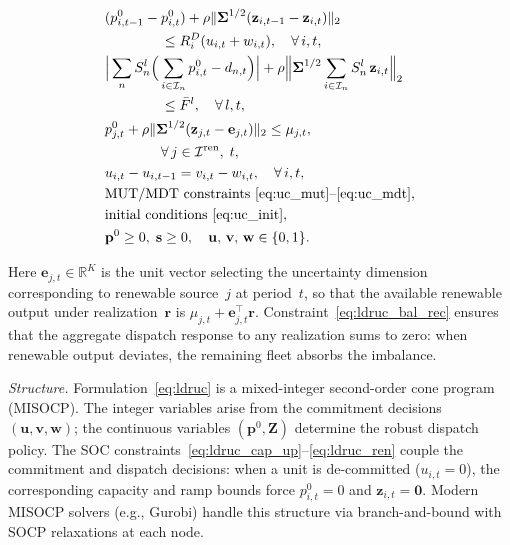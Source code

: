 \documentclass[journal]{IEEEtran}
\begin{document}
\begin{subequations}
\begin{align}
& (p_{i,t-1}^0 - p_{i,t}^0)
  + \rho \lVert \boldsymbol{\Sigma}^{1/2}
    (\mathbf{z}_{i,t-1} - \mathbf{z}_{i,t}) \rVert_2
  \nonumber\\
& \qquad\qquad
  \leq R_i^D (u_{i,t} + w_{i,t}),
  \quad \forall\, i,t,
  \label{eq:ldruc_ramp_dn} \\
& \Big|\sum_n S_n^l
  \Big(\sum_{i \in \mathcal{I}_n} p_{i,t}^0 - d_{n,t}\Big)\Big|
  + \rho \Big\lVert \boldsymbol{\Sigma}^{1/2}
    \sum_{i \in \mathcal{I}_n} S_n^l\, \mathbf{z}_{i,t}
  \Big\rVert_2
  \nonumber\\
& \qquad\qquad
  \leq \bar{F}^l,
  \quad \forall\, l,t,
  \label{eq:ldruc_flow} \\
& p_{j,t}^0
  + \rho \lVert \boldsymbol{\Sigma}^{1/2}
    (\mathbf{z}_{j,t} - \mathbf{e}_{j,t}) \rVert_2
  \leq \mu_{j,t},
  \nonumber\\
& \qquad\qquad
  \forall\, j \in \mathcal{I}^{\text{ren}},\; t,
  \label{eq:ldruc_ren} \\
& u_{i,t} - u_{i,t-1} = v_{i,t} - w_{i,t},
  \quad \forall\, i,t,
  \label{eq:ldruc_logic} \\
& \text{MUT/MDT constraints}~\eqref{eq:uc_mut}\text{--}\eqref{eq:uc_mdt},
  \label{eq:ldruc_mutmdt} \\
& \text{initial conditions}~\eqref{eq:uc_init},
  \label{eq:ldruc_init} \\
& \mathbf{p}^0 \geq 0,\; \mathbf{s} \geq 0, \quad
  \mathbf{u},\, \mathbf{v},\, \mathbf{w} \in \{0,1\}.
  \label{eq:ldruc_domain}
\end{align}
\end{subequations}

Here $\mathbf{e}_{j,t} \in \mathbb{R}^K$ is the unit vector
selecting the uncertainty dimension corresponding to renewable
source~$j$ at period~$t$, so that the available renewable output
under realization~$\mathbf{r}$ is $\mu_{j,t} + \mathbf{e}_{j,t}^\top
\mathbf{r}$.
Constraint~\eqref{eq:ldruc_bal_rec} ensures that the aggregate
dispatch response to any realization sums to zero: when renewable
output deviates, the remaining fleet absorbs the imbalance.

\emph{Structure.}
Formulation~\eqref{eq:ldruc} is a mixed-integer second-order cone
program (MISOCP).
The integer variables arise from the commitment decisions
$(\mathbf{u}, \mathbf{v}, \mathbf{w})$; the continuous variables
$(\mathbf{p}^0, \mathbf{Z})$ determine the robust dispatch policy.
The SOC constraints~\eqref{eq:ldruc_cap_up}--\eqref{eq:ldruc_ren}
couple the commitment and dispatch decisions: when a unit is
de-committed ($u_{i,t} = 0$), the corresponding capacity and ramp
bounds force $p_{i,t}^0 = 0$ and $\mathbf{z}_{i,t} = \mathbf{0}$.
Modern MISOCP solvers (e.g., Gurobi) handle this structure via
branch-and-bound with SOCP relaxations at each node.
\end{document}
